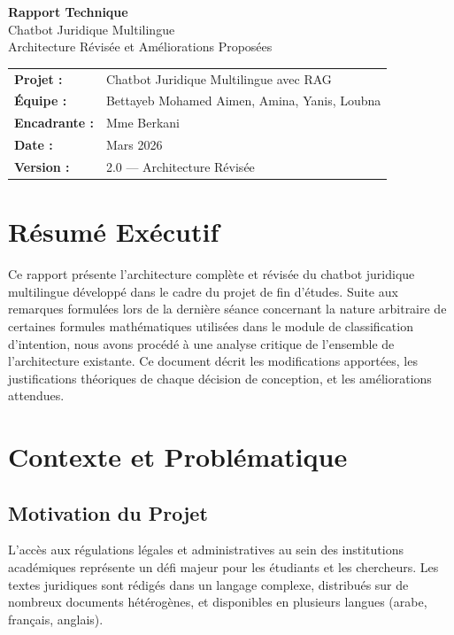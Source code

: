 \documentclass[11pt,a4paper]{article}
\begin{document}
\begin{titlepage}
\centering
\vspace*{2cm}
{\Huge\bfseries\color{sectioncolor} Rapport Technique}\\[0.5em]
{\LARGE Chatbot Juridique Multilingue}\\[0.3em]
{\large Architecture Révisée et Améliorations Proposées}\\[2cm]
\begin{tabular}{ll}
\textbf{Projet :} & Chatbot Juridique Multilingue avec RAG \\
\textbf{Équipe :} & Bettayeb Mohamed Aimen, Amina, Yanis, Loubna \\
\textbf{Encadrante :} & Mme Berkani \\
\textbf{Date :} & Mars 2026 \\
\textbf{Version :} & 2.0 --- Architecture Révisée \\
\end{tabular}
\vfill
\end{titlepage}

\tableofcontents
\newpage

\section{Résumé Exécutif}

Ce rapport présente l'architecture complète et révisée du chatbot juridique multilingue développé dans le cadre du projet de fin d'études. Suite aux remarques formulées lors de la dernière séance concernant la nature arbitraire de certaines formules mathématiques utilisées dans le module de classification d'intention, nous avons procédé à une analyse critique de l'ensemble de l'architecture existante. Ce document décrit les modifications apportées, les justifications théoriques de chaque décision de conception, et les améliorations attendues.

\section{Contexte et Problématique}

\subsection{Motivation du Projet}

L'accès aux régulations légales et administratives au sein des institutions académiques représente un défi majeur pour les étudiants et les chercheurs. Les textes juridiques sont rédigés dans un langage complexe, distribués sur de nombreux documents hétérogènes, et disponibles en plusieurs langues (arabe, français, anglais).
\end{document}
